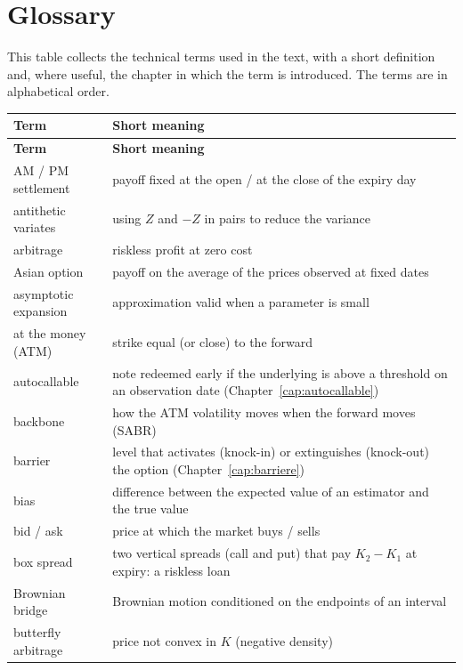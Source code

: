\chapter{Glossary}
\label{app:glossario}

This table collects the technical terms used in the text, with a short definition and, where useful, the chapter in
which the term is introduced. The terms are in alphabetical order.

\begin{small}
\renewcommand{\arraystretch}{1.1}
\begin{longtable}{@{}>{\raggedright\arraybackslash}p{}%
  >{\raggedright\arraybackslash}p{}@{}}
\toprule
\textbf{Term} & \textbf{Short meaning}\\
\midrule
\endfirsthead
\toprule
\textbf{Term} & \textbf{Short meaning}\\
\midrule
\endhead
\bottomrule
\endfoot
AM / PM settlement & payoff fixed at the open / at the close of the expiry day\\
antithetic variates & using $Z$ and $-Z$ in pairs to reduce the variance\\
arbitrage & riskless profit at zero cost\\
Asian option & payoff on the average of the prices observed at fixed dates\\
asymptotic expansion & approximation valid when a parameter is small\\
at the money (ATM) & strike equal (or close) to the forward\\
autocallable & note redeemed early if the underlying is above a threshold on an observation date (Chapter~\ref{cap:autocallable})\\
backbone & how the ATM volatility moves when the forward moves (SABR)\\
barrier & level that activates (knock-in) or extinguishes (knock-out) the option (Chapter~\ref{cap:barriere})\\
bias & difference between the expected value of an estimator and the true value\\
bid / ask & price at which the market buys / sells\\
box spread & two vertical spreads (call and put) that pay $K_2-K_1$ at expiry: a riskless loan\\
Brownian bridge & Brownian motion conditioned on the endpoints of an interval\\
butterfly arbitrage & price not convex in $K$ (negative density)\\

\end{longtable}
\end{small}
